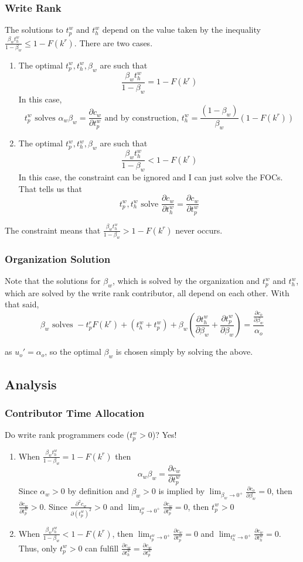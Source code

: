 \documentclass[12pt,notitlepage]{article}
\begin{document}
\subsubsection{Write Rank}
The solutions to $t_p^w$ and $t_h^w$ depend on the value taken by the inequality $\frac{\beta_w t_h^w}{1-\beta_w} \leq 1-F(k^r)$. There are two cases.
\begin{enumerate}
    \item The optimal $t_p^w, t_h^w, \beta_w$ are such that
    $$\frac{\beta_w t_h^w}{1-\beta_w} = 1-F(k^r)$$
    In this case, 
    $$t_p^w \text{ solves } \alpha_w \beta_w = \frac{\partial c_w}{\partial t_p^w} \text{ and by construction, } t_h^w = \frac{(1-\beta_w)}{\beta_w} (1 -F(k^r))$$
    \item The optimal $t_p^w, t_h^w, \beta_w$ are such that
    $$\frac{\beta_w t_h^w}{1-\beta_w} < 1-F(k^r)$$
    In this case, the constraint can be ignored and I can just solve the FOCs. That tells us that 
    $$t_p^w, t_h^w \text{ solve } \frac{\partial c_w}{\partial t_h^w} = \frac{\partial c_w}{\partial t_p^w}$$
\end{enumerate}
The constraint means that $\frac{\beta_w t_h^w}{1-\beta_w} > 1-F(k^r)$ never occurs. 
\subsubsection{Organization Solution}
Note that the solutions for $\beta_w$, which is solved by the organization and $t_p^w$ and $t_h^w$, which are solved by the write rank contributor, all depend on each other. With that said, 
$$\beta_w \text{ solves } -t_p^rF(k^r) + (t_h^w + t_p^w) + \beta_w\left(\frac{\partial t_h^w}{\partial \beta_w} + \frac{\partial t_p^w}{\partial \beta_w}\right) = \frac{\frac{\partial c_o}{\partial \beta_w}}{\alpha_o}$$

as $u_o' = \alpha_o$, so the optimal $\beta_w$ is chosen simply by solving the above. 

\subsection{Analysis}
\subsubsection{Contributor Time Allocation}
Do write rank programmers code ($t_p^w>0$)? Yes!
\begin{enumerate}
    \item When $\frac{\beta_w t_h^w}{1-\beta_w} = 1-F(k^r)$ then
    $$\alpha_w \beta_w = \frac{\partial c_w}{\partial t_p^w}$$
    Since $\alpha_w>0$ by definition and $\beta_w>0$ is implied by $\lim_{\beta_w \to 0^+} \frac{\partial c_o}{\partial \beta_w} = 0$, then $\frac{\partial c_w}{\partial t_p^w}>0$. Since $\frac{\partial^2 c_w}{\partial (t_p^w)^2}>0$ and $\lim_{t_p^w \to 0^+} \frac{\partial c_w}{\partial t_p^w} = 0$, then $t_p^w>0$
    \item When $\frac{\beta_w t_h^w}{1-\beta_w} < 1-F(k^r)$, then $\lim_{t_p^w \to 0^+} \frac{\partial c_w}{\partial t_p^w} = 0$ and $\lim_{t_h^w \to 0^+} \frac{\partial c_w}{\partial t_h^w} = 0$. Thus, only $t_p^w>0$ can fulfill $\frac{\partial c_w}{\partial t_h^w} = \frac{\partial c_w}{\partial t_p^w}$
\end{enumerate}
\end{document}
